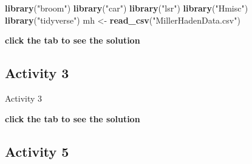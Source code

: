 \documentclass[]{book}
\newenvironment{Shaded}{\begin{snugshade}}{\end{snugshade}}
\newcommand{\CommentTok}[1]{\textcolor[rgb]{0.56,0.35,0.01}{\textit{#1}}}
\newcommand{\DataTypeTok}[1]{\textcolor[rgb]{0.13,0.29,0.53}{#1}}
\newcommand{\KeywordTok}[1]{\textcolor[rgb]{0.13,0.29,0.53}{\textbf{#1}}}
\newcommand{\NormalTok}[1]{#1}
\newcommand{\OperatorTok}[1]{\textcolor[rgb]{0.81,0.36,0.00}{\textbf{#1}}}
\newcommand{\StringTok}[1]{\textcolor[rgb]{0.31,0.60,0.02}{#1}}
\begin{document}
\begin{Shaded}
\begin{Highlighting}[]
\KeywordTok{library}\NormalTok{(}\StringTok{"broom"}\NormalTok{)}
\KeywordTok{library}\NormalTok{(}\StringTok{"car"}\NormalTok{)}
\KeywordTok{library}\NormalTok{(}\StringTok{"lsr"}\NormalTok{)}
\KeywordTok{library}\NormalTok{(}\StringTok{"Hmisc"}\NormalTok{)}
\KeywordTok{library}\NormalTok{(}\StringTok{"tidyverse"}\NormalTok{)}
\NormalTok{mh <-}\StringTok{ }\KeywordTok{read_csv}\NormalTok{(}\StringTok{"MillerHadenData.csv"}\NormalTok{)}
\end{Highlighting}
\end{Shaded}

\textbf{click the tab to see the solution}

\hypertarget{activity-3-2}{%
\subsection{Activity 3}\label{activity-3-2}}

Activity 3

\begin{Shaded}
\end{Shaded}

\textbf{click the tab to see the solution}

\hypertarget{activity-5-2}{%
\subsection{Activity 5}\label{activity-5-2}}
\end{document}
